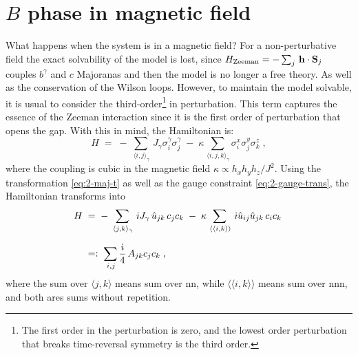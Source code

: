 


\section[B phase in a magnetic field]{$B$ phase in magnetic field}

What happens when the system is in a magnetic field? For a non-perturbative field the exact solvability of the model is lost, since $H_\text{Zeeman} = -\sum_j \,  \bf{h} \cdot \bf{S}_j $ couples $b^\gamma$ and $c$ Majoranas and then the model is no longer a free theory. As well as the conservation of the Wilson loops. %
However,  to maintain the model solvable, it is usual to consider the third-order\footnote{The first order in the  perturbation is zero, and the lowest order perturbation that breaks time-reversal symmetry is the third order.} in perturbation. This term captures the essence of the Zeeman interaction since it is the first order of perturbation that opens the gap. With this in mind, the Hamiltonian is: 
\begin{equation}
    H \; = \; -  \, \sum_{\, \langle i,j \rangle_{\gamma} }  \, J_{\gamma} \sigma_{i}^{\gamma} \sigma_{j}^{\gamma}    \; - \; \kappa  \sum_{ \,  \langle i,j,k \rangle_{\gamma} }   \sigma_{i}^{x} \sigma_{j}^{y} \sigma_{k}^{z} \; , \label{2-Ham-mag}
\end{equation} %
where the coupling is cubic in the magnetic field $\kappa \propto h_x h_y h_z/J^2$. %
Using the transformation \eqref{eq:2-maj-t} as well as the gauge constraint \eqref{eq:2-gauge-trans}, the Hamiltonian transforms into 
\begin{equation}
\begin{split}
    H \; & = \; -  \, \sum_{\, \langle j,k \rangle_{\gamma} }  \, \im J_{\gamma} \, \hat{u}_{jk} \, c_j c_k    \; - \; \kappa  \sum_{ \, \langle \langle i,k \rangle \rangle }   \, \im \hat{u}_{ij}\hat{u}_{jk} \,c_i c_k \;  \\[7pt]
   \; & =: \;  \sum_{\,i,j } \frac{\im }{ 4} \, A_{jk} c_j c_k \; , 
    \end{split}
\end{equation}
where the sum over  $\langle j,k \rangle$ means sum over \acrlong{nn}, while $\langle \langle i,k \rangle \rangle$ means sum over \acrlong{nnn}, and both ares sums without repetition. 

